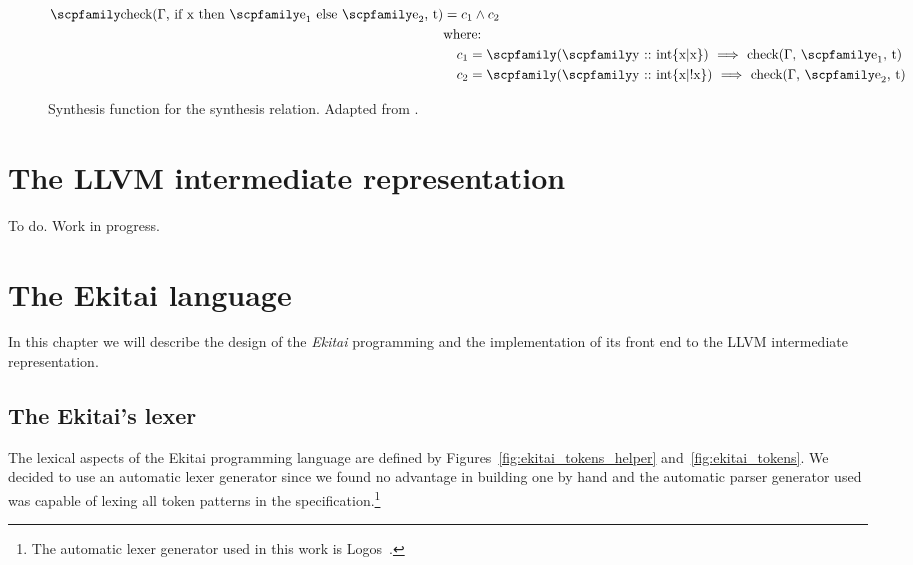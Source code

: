 \documentclass[
  oneside,
  english,
  coorientadorbanca,
  noabntexcite
]{ufsc-thesis-rn46-2019}
\newcommand{\code}[1]{\text{\scpfamily\setlength\spaceskip{0.35em}#1}}
\newcommand{\implcons}[3]{\code{$($\code{#1} $::$ #2$)$ $\implies$ #3}}
\begin{document}
\begin{figure}[ht]
\begin{align*}
    \code{check($\Gamma$, if x then $\code{e}_1$ else $\code{e}_2$, t)}
     & = c_1 \land c_2                                                         \\
     & \textrm{where:}                                                         \\
     & \quad c_1 = \implcons{y}{int\{x|x\}}{check($\Gamma$, $\code{e}_1$, t)}  \\
     & \quad c_2 = \implcons{y}{int\{x|!x\}}{check($\Gamma$, $\code{e}_2$, t)}
  \end{align*}
  \caption{
    Synthesis function for the synthesis relation.
    Adapted from \textcite{jhala2020tutorial}.
  }\label{fig:check_function_impl}
\end{figure}

\chapter{The LLVM intermediate representation}\label{ch:llvm}

To do. Work in progress.

\chapter{The Ekitai language}\label{chapter:proposal}

In this chapter we will describe the design of the \textit{Ekitai} programming and the implementation of its front end to the LLVM intermediate representation.

\section{The Ekitai's lexer}

The lexical aspects of the Ekitai programming language are defined by Figures~\ref{fig:ekitai_tokens_helper} and~\ref{fig:ekitai_tokens}.
We decided to use an automatic lexer generator since we found no advantage in building one by hand and the automatic parser generator used was capable of lexing all token patterns in the specification.\footnote{The automatic lexer generator used in this work is Logos~\cite{logos2020}.}
\end{document}
